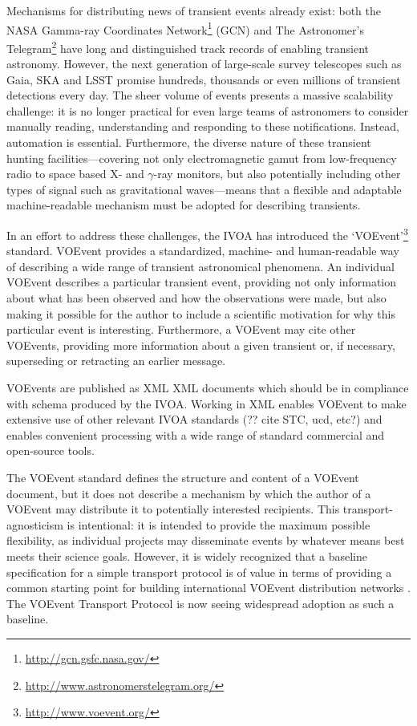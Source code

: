 \documentclass[5p,authoryear]{elsarticle}
\begin{document}
Mechanisms for distributing news of transient events already exist: both the
NASA Gamma-ray Coordinates Network\footnote{\url{http://gcn.gsfc.nasa.gov/}}
(GCN) and The Astronomer's
Telegram\footnote{\url{http://www.astronomerstelegram.org/}} have long and
distinguished track records of enabling transient astronomy. However, the next
generation of large-scale survey telescopes such as Gaia, SKA and LSST promise
hundreds, thousands or even millions of transient detections every day. The
sheer volume of events presents a massive scalability challenge: it is no
longer practical for even large teams of astronomers to consider manually
reading, understanding and responding to these notifications. Instead,
automation is essential. Furthermore, the diverse nature of these transient
hunting facilities---covering not only electromagnetic gamut from
low-frequency radio to space based X- and $\gamma$-ray monitors, but also
potentially including other types of signal such as gravitational
waves---means that a flexible and adaptable machine-readable mechanism must be
adopted for describing transients.

In an effort to address these challenges, the IVOA has introduced the
`VOEvent'\footnote{\url{http://www.voevent.org/}} \citep{Seaman:2011}
standard. VOEvent provides a standardized, machine- and human-readable way of
describing a wide range of transient astronomical phenomena. An individual
VOEvent describes a particular transient event, providing not only information
about what has been observed and how the observations were made, but also
making it possible for the author to include a scientific motivation for why
this particular event is interesting. Furthermore, a VOEvent may cite other
VOEvents, providing more information about a given transient or, if necessary,
superseding or retracting an earlier message.

VOEvents are published as XML \citep{Bray:2008} XML documents which should be
in compliance with schema \citep{Gau:2012, Peterson:2012} produced by the
IVOA. Working in XML enables VOEvent to make extensive use of other relevant
IVOA standards (?? cite STC, ucd, etc?) and enables convenient processing with
a wide range of standard commercial and open-source tools.

The VOEvent standard defines the structure and content of a VOEvent document,
but it does not describe a mechanism by which the author of a VOEvent may
distribute it to potentially interested recipients. This transport-agnosticism
is intentional: it is intended to provide the maximum possible flexibility, as
individual projects may disseminate events by whatever means best meets their
science goals. However, it is widely recognized that a baseline specification
for a simple transport protocol is of value in terms of providing a common
starting point for building international VOEvent distribution networks
\citep{Williams:2012}. The VOEvent Transport Protocol
\citep[VTP;][]{Allan:2009} is now seeing widespread adoption as such a
baseline.
\end{document}
